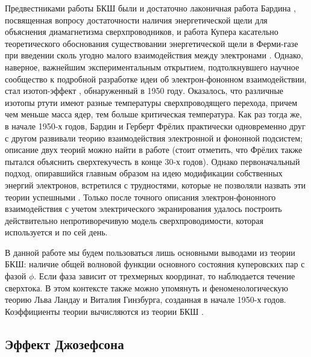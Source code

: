 \documentclass[14pt, a4paper]{extreport}
\numberwithin{equation}{section}
\begin{document}
Предвестниками работы БКШ были и достаточно лаконичная работа Бардина \cite{bardeen1955theory}, посвященная вопросу достаточности наличия энергетической щели для объяснения диамагнетизма сверхпроводников, и работа Купера касательно теоретического обоснования существовании энергетической щели в Ферми-газе при введении сколь угодно малого взаимодействия между электронами \cite{cooper1956bound}. Однако, наверное, важнейшим экспериментальным открытием, подтолкнувшего научное сообщество к подробной разработке идеи об электрон-фононном взаимодействии, стал изотоп-эффект \cite{maxwell1950isotope,reynolds1950superconductivity,de1954isotope}, обнаруженный в 1950 году. Оказалось, что различные изотопы ртути имеют разные температуры сверхпроводящего перехода, причем чем меньше масса ядер, тем больше критическая температура. Как раз тогда же, в начале 1950-х годов, Бардин и Герберт Фрёлих практически одновременно друг с другом развивали теорию взаимодействия электронной и фононной подсистем; описание двух теорий можно найти в работе \cite{bardeen1951electron} (стоит отметить, что Фрёлих также пытался объяснить сверхтекучесть в конце 30-х годов). Однако первоначальный подход, опиравшийся главным образом на идею модификации собственных энергий электронов, встретился с трудностями, которые не позволяли назвать эти теории успешными \cite{bardeen1957theory}. Только после точного описания электрон-фононного взаимодействия с учетом электрического экранирования \cite{bardeen1955electron} удалось построить действительно непротиворечивую модель сверхпроводимости, которая используется и по сей день.

В данной работе мы будем пользоваться лишь основными выводами из теории БКШ: наличие общей волновой функции основного состояния куперовских пар с фазой $\phi$. Если фаза зависит от трехмерных координат, то наблюдается течение сверхтока. В этом контексте также можно упомянуть и феноменологическую теорию Льва Ландау и Виталия Гинзбурга, созданная в начале 1950-х годов. Коэффициенты теории вычисляются из теории БКШ \cite{gor1959microscopic}.

\subsection{Эффект Джозефсона}
\end{document}
